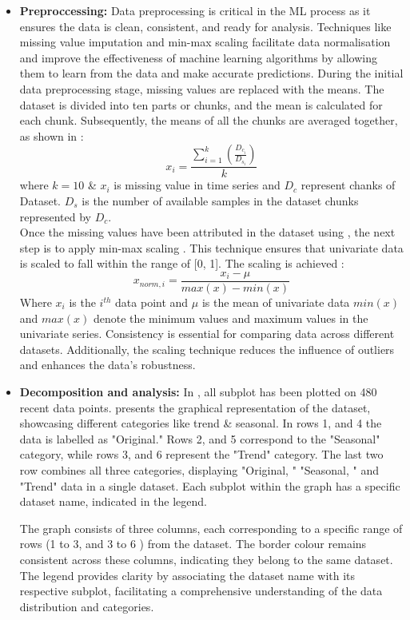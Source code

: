 \begin{itemize}
\item \textbf{Preproccessing: }Data preprocessing is critical in the ML process as it ensures the data is clean,  consistent,  and ready for analysis. Techniques like missing value imputation and min-max scaling facilitate data normalisation and improve the effectiveness of machine learning algorithms by allowing them to learn from the data and make accurate predictions.
During the initial data preprocessing stage,  missing values are replaced with the means. The dataset is divided into ten parts or chunks,  and the mean is calculated for each chunk. Subsequently,  the means of all the chunks are averaged together,  as shown in :
\begin{equation} \label{equ: mean}
        x_i=\frac{\sum_{i=1}^{k} \left(\frac{D_{c_{i}}}{D_{s_{i}}} \right)}{k}
\end{equation}
 where $k=10$ \& $x_i$ is missing value in time series and $D_c$ represent chanks of Dataset. $D_s$ is the number of available samples in the dataset chunks represented by $D_c$. \\
Once the missing values have been attributed in the dataset using , the next step is to apply min-max scaling . This technique ensures that univariate data is scaled to fall within the range of [0, 1]. The scaling is achieved : 
\begin{equation}
        x_{norm,  i}=\frac{x_i - \mu}{max(x)-min(x)}
        \label{equ: minmax}
    \end{equation}
Where $x_i$ is the $i^{th}$ data point and $\mu$ is the mean of univariate data $min(x)$  and $max(x)$ denote the minimum values and maximum values in the univariate series. Consistency is essential for comparing data across different datasets. Additionally,  the scaling technique reduces the influence of outliers and enhances the data's robustness.
\item
\textbf{Decomposition and analysis: }
In , all subplot has been plotted on 480 recent data points.  presents the graphical representation of the dataset,  showcasing different categories like trend \&  seasonal. In rows 1,  and 4  the data is labelled as "Original." Rows 2,  and 5 correspond to the "Seasonal" category,  while rows 3,  and 6 represent the "Trend" category. The last two row combines all three categories,  displaying "Original, " "Seasonal, " and "Trend" data in a single dataset. Each subplot within the graph has a specific dataset name,  indicated in the legend.
\par The graph consists of three columns,  each corresponding to a specific range of rows (1 to 3, and 3 to 6 ) from the dataset. The border colour remains consistent across these columns,  indicating they belong to the same dataset. The legend provides clarity by associating the dataset name with its respective subplot,  facilitating a comprehensive understanding of the data distribution and categories.



\end{itemize}
